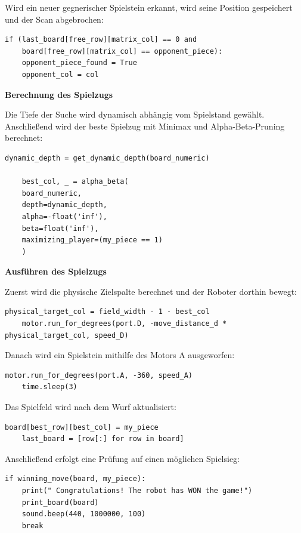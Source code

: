 Wird ein neuer gegnerischer Spielstein erkannt, wird seine Position gespeichert und der Scan abgebrochen:

\begin{lstlisting}[style=pythonstyle]
	if (last_board[free_row][matrix_col] == 0 and
	board[free_row][matrix_col] == opponent_piece):
	opponent_piece_found = True
	opponent_col = col
\end{lstlisting}

\textbf{Berechnung des Spielzugs}

Die Tiefe der Suche wird dynamisch abhängig vom Spielstand gewählt. Anschließend wird der beste Spielzug mit Minimax und Alpha-Beta-Pruning berechnet:

\begin{lstlisting}[style=pythonstyle]
	dynamic_depth = get_dynamic_depth(board_numeric)
	
	best_col, _ = alpha_beta(
	board_numeric,
	depth=dynamic_depth,
	alpha=-float('inf'),
	beta=float('inf'),
	maximizing_player=(my_piece == 1)
	)
\end{lstlisting}

\textbf{Ausführen des Spielzugs}

Zuerst wird die physische Zielspalte berechnet und der Roboter dorthin bewegt:

\begin{lstlisting}[style=pythonstyle]
	physical_target_col = field_width - 1 - best_col
	motor.run_for_degrees(port.D, -move_distance_d * physical_target_col, speed_D)
\end{lstlisting}

Danach wird ein Spielstein mithilfe des Motors A ausgeworfen:

\begin{lstlisting}[style=pythonstyle]
	motor.run_for_degrees(port.A, -360, speed_A)
	time.sleep(3)
\end{lstlisting}

Das Spielfeld wird nach dem Wurf aktualisiert:

\begin{lstlisting}[style=pythonstyle]
	board[best_row][best_col] = my_piece
	last_board = [row[:] for row in board]
\end{lstlisting}

Anschließend erfolgt eine Prüfung auf einen möglichen Spielsieg:

\begin{lstlisting}[style=pythonstyle]
	if winning_move(board, my_piece):
	print(" Congratulations! The robot has WON the game!")
	print_board(board)
	sound.beep(440, 1000000, 100)
	break
\end{lstlisting}

